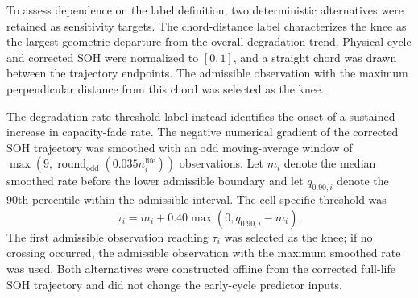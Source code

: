 \documentclass[pdflatex,sn-mathphys-num]{sn-jnl}
\begin{document}
To assess dependence on the label definition, two deterministic alternatives were retained as sensitivity targets. The chord-distance label characterizes the knee as the largest geometric departure from the overall degradation trend. Physical cycle and corrected SOH were normalized to $[0,1]$, and a straight chord was drawn between the trajectory endpoints. The admissible observation with the maximum perpendicular distance from this chord was selected as the knee.

The degradation-rate-threshold label instead identifies the onset of a sustained increase in capacity-fade rate. The negative numerical gradient of the corrected SOH trajectory was smoothed with an odd moving-average window of $\max(9,\operatorname{round}_{\mathrm{odd}}(0.035n_i^{\mathrm{life}}))$ observations. Let $m_i$ denote the median smoothed rate before the lower admissible boundary and let $q_{0.90,i}$ denote the 90th percentile within the admissible interval. The cell-specific threshold was
\begin{equation}
\tau_i=m_i+0.40\max\!\left(0,q_{0.90,i}-m_i\right).
\end{equation}
The first admissible observation reaching $\tau_i$ was selected as the knee; if no crossing occurred, the admissible observation with the maximum smoothed rate was used. Both alternatives were constructed offline from the corrected full-life SOH trajectory and did not change the early-cycle predictor inputs.



\end{document}
